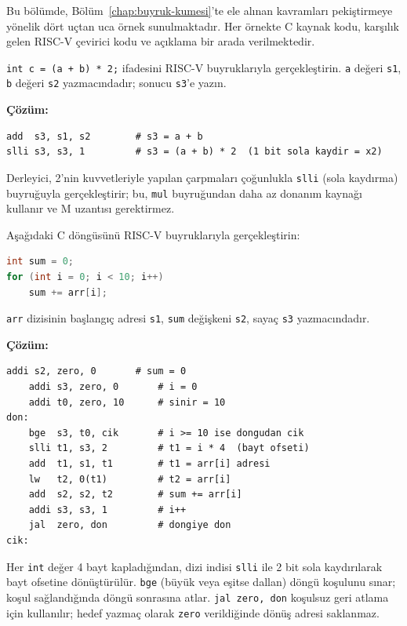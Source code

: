 Bu bölümde, Bölüm~\ref{chap:buyruk-kumesi}'te ele alınan kavramları pekiştirmeye yönelik dört uçtan uca örnek sunulmaktadır. Her örnekte C kaynak kodu, karşılık gelen RISC-V çevirici kodu ve açıklama bir arada verilmektedir.

\begin{ornek}[C.1]
\label{orn:ekc-aritmetik}
\texttt{int c = (a + b) * 2;} ifadesini RISC-V buyruklarıyla gerçekleştirin. \texttt{a} değeri \texttt{s1}, \texttt{b} değeri \texttt{s2} yazmacındadır; sonucu \texttt{s3}'e yazın.

\textbf{Çözüm:}
\begin{lstlisting}[style=riscv]
add  s3, s1, s2        # s3 = a + b
slli s3, s3, 1         # s3 = (a + b) * 2  (1 bit sola kaydir = x2)
\end{lstlisting}

Derleyici, 2'nin kuvvetleriyle yapılan çarpmaları çoğunlukla \texttt{slli} (sola kaydırma) buyruğuyla gerçekleştirir; bu, \texttt{mul} buyruğundan daha az donanım kaynağı kullanır ve M uzantısı gerektirmez.
\end{ornek}

\begin{ornek}[C.2]
\label{orn:ekc-dongu}
Aşağıdaki C döngüsünü RISC-V buyruklarıyla gerçekleştirin:
\begin{lstlisting}[language=C]
int sum = 0;
for (int i = 0; i < 10; i++)
    sum += arr[i];
\end{lstlisting}
\texttt{arr} dizisinin başlangıç adresi \texttt{s1}, \texttt{sum} değişkeni \texttt{s2}, sayaç \texttt{s3} yazmacındadır.

\textbf{Çözüm:}
\begin{lstlisting}[style=riscv]
    addi s2, zero, 0       # sum = 0
    addi s3, zero, 0       # i = 0
    addi t0, zero, 10      # sinir = 10
don:
    bge  s3, t0, cik       # i >= 10 ise dongudan cik
    slli t1, s3, 2         # t1 = i * 4  (bayt ofseti)
    add  t1, s1, t1        # t1 = arr[i] adresi
    lw   t2, 0(t1)         # t2 = arr[i]
    add  s2, s2, t2        # sum += arr[i]
    addi s3, s3, 1         # i++
    jal  zero, don         # dongiye don
cik:
\end{lstlisting}

Her \texttt{int} değer 4 bayt kapladığından, dizi indisi \texttt{slli} ile 2 bit sola kaydırılarak bayt ofsetine dönüştürülür. \texttt{bge} (büyük veya eşitse dallan) döngü koşulunu sınar; koşul sağlandığında döngü sonrasına atlar. \texttt{jal zero, don} koşulsuz geri atlama için kullanılır; hedef yazmaç olarak \texttt{zero} verildiğinde dönüş adresi saklanmaz.
\end{ornek}


